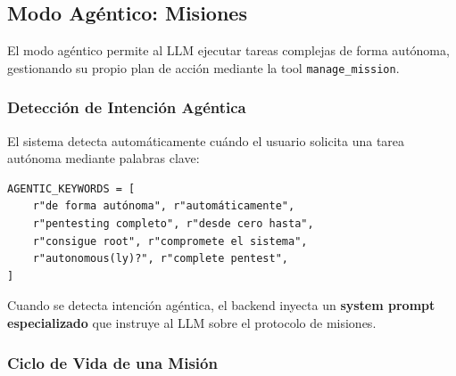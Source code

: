 \subsection{Modo Agéntico: Misiones}

El modo agéntico permite al LLM ejecutar tareas complejas de forma autónoma, gestionando su propio plan de acción mediante la tool \texttt{manage\_mission}.

\subsubsection{Detección de Intención Agéntica}

El sistema detecta automáticamente cuándo el usuario solicita una tarea autónoma mediante palabras clave:

\begin{verbatim}
AGENTIC_KEYWORDS = [
    r"de forma autónoma", r"automáticamente",
    r"pentesting completo", r"desde cero hasta",
    r"consigue root", r"compromete el sistema",
    r"autonomous(ly)?", r"complete pentest",
]
\end{verbatim}

Cuando se detecta intención agéntica, el backend inyecta un \textbf{system prompt especializado} que instruye al LLM sobre el protocolo de misiones.

\subsubsection{Ciclo de Vida de una Misión}

